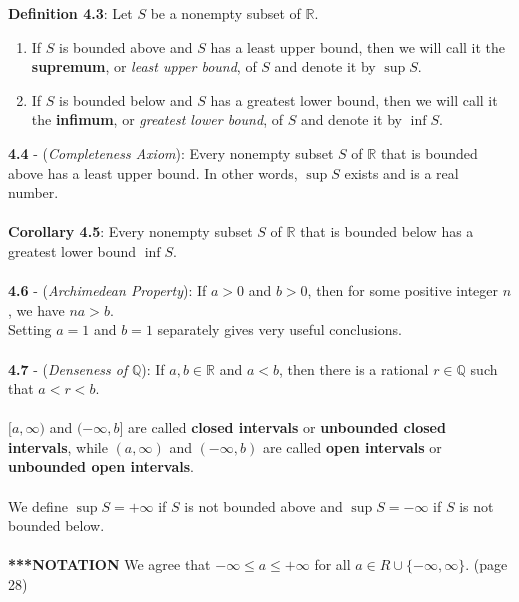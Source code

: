 \documentclass{article}
\theoremstyle{definition}
\DeclareMathOperator{\Sup}{sup}
\begin{document}
\textbf{Definition 4.3}: Let $S$ be a nonempty subset of $\mathbb{R}$. \begin{enumerate}
    \item If $S$ is bounded above and $S$ has a least upper bound, then we will call it the \textbf{supremum}, or \textit{least upper bound}, of $S$ and denote it by $\sup{S}$.
    \item If $S$ is bounded below and $S$ has a greatest lower bound, then we will call it the \textbf{infimum}, or \textit{greatest lower bound}, of $S$ and denote it by $\inf{S}$.
\end{enumerate} $ $ \\
\textbf{4.4} - (\textit{Completeness Axiom}): Every nonempty subset $S$ of $\mathbb{R}$ that is bounded above has a least upper bound. In other words, $\sup{S}$ exists and is a real number. \\ \\
\textbf{Corollary 4.5}: Every nonempty subset $S$ of $\mathbb{R}$ that is bounded below has a greatest lower bound $\inf{S}$. \\ \\
\textbf{4.6} - (\textit{Archimedean Property}): If $a > 0$ and $b > 0$, then for some positive integer $n$, we have $na > b$. \\
Setting $a = 1$ and $b = 1$ separately gives very useful conclusions. \\ \\
\textbf{4.7} - (\textit{Denseness of} $\mathbb{Q}$): If $a, b \in \mathbb{R}$ and $a < b$, then there is a rational $r \in \mathbb{Q}$ such that $a < r < b$. \\ \\
$[a, \infty)$ and $(-\infty, b]$ are called \textbf{closed intervals} or \textbf{unbounded closed intervals}, while $(a, \infty)$ and $(-\infty, b)$ are called \textbf{open intervals} or \textbf{unbounded open intervals}. \\ \\
We define $\Sup{S} = +\infty$ if $S$ is not bounded above and $\Sup{S} = -\infty$ if $S$ is not bounded below. \\ \\
\textbf{***NOTATION} We agree that $-\infty \leq a \leq +\infty$ for all $a \in R \cup \{-\infty, \infty\}$. (page 28)
\end{document}
